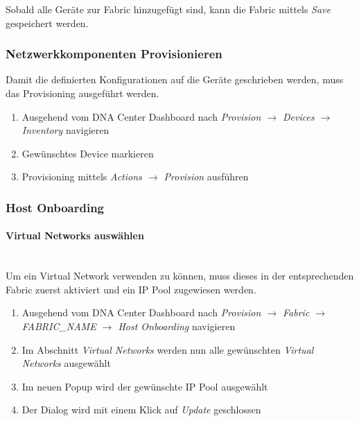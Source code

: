 Sobald alle Geräte zur Fabric hinzugefügt sind, kann die Fabric mittels \textit{Save} gespeichert werden.

\subsubsection{Netzwerkkomponenten Provisionieren}
Damit die definierten Konfigurationen auf die Geräte geschrieben werden, muss das Provisioning ausgeführt werden.
\begin{enumerate}
	\item Ausgehend vom DNA Center Dashboard nach \textit{Provision $\rightarrow$ Devices $\rightarrow$ Inventory} navigieren
	\item Gewünschtes Device markieren
	\item Provisioning mittels \textit{Actions $\rightarrow$ Provision} ausführen 
\end{enumerate}

\subsubsection{Host Onboarding}

\paragraph{Virtual Networks auswählen}
~\\
Um ein Virtual Network verwenden zu können, muss dieses in der entsprechenden Fabric zuerst aktiviert und ein IP Pool zugewiesen werden.
\begin{enumerate}
	\item Ausgehend vom DNA Center Dashboard nach \textit{Provision $\rightarrow$ Fabric $\rightarrow$ FABRIC\_NAME $\rightarrow$ Host Onboarding} navigieren
	\item Im Abschnitt \textit{Virtual Networks} werden nun alle gewünschten \textit{Virtual Networks} ausgewählt
	\item Im neuen Popup wird der gewünschte IP Pool ausgewählt
	\item Der Dialog wird mit einem Klick auf \textit{Update} geschlossen
\end{enumerate}


